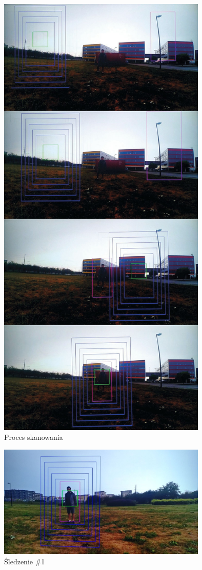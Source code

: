 \begin{figure}[h]
	\centering
	\includegraphics[width=10cm]{6_scan_1.jpg}
	\caption{Proces skanowania}
	\label{fig:scan_screenshot}
\end{figure}

\begin{figure}[h]
	\centering
	\includegraphics[width=10cm]{6_track_1.jpg}
	\caption{Śledzenie \#1}
	\label{fig:track_1}
\end{figure}

